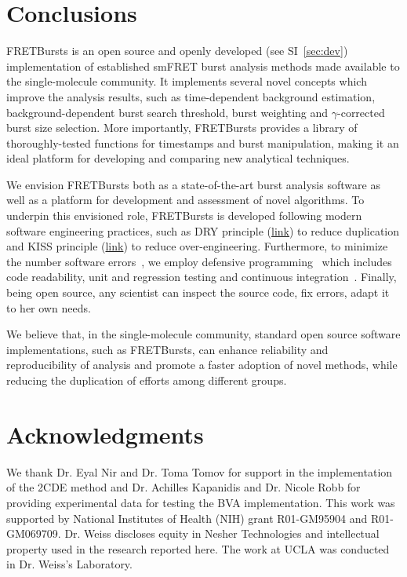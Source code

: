 \section{Conclusions}
\label{sec:conclusions}

FRETBursts is an open source and openly developed (see SI~\ref{sec:dev}) implementation
of established smFRET burst analysis methods
made available to the single-molecule community.
It implements several novel concepts which improve the analysis results, such as
time-dependent background estimation, background-dependent burst search threshold,
burst weighting and $\gamma$-corrected burst size selection.
More importantly, FRETBursts provides a library of thoroughly-tested functions
for timestamps and burst manipulation, making it an ideal platform for
developing and comparing new analytical techniques.

We envision FRETBursts both as a state-of-the-art burst analysis
software as well as a platform for development and assessment of novel algorithms.
To underpin this envisioned role, FRETBursts is developed following modern
software engineering practices, such as DRY principle
(\href{http://en.wikipedia.org/wiki/Don\%27t_repeat_yourself}{link})
to reduce duplication and KISS principle
(\href{http://en.wikipedia.org/wiki/KISS_principle}{link})
to reduce over-engineering. Furthermore, to minimize the number software errors~\cite{Merali_2010,Soergel_2015},
we employ defensive programming~\cite{Prli__2012} which includes code readability,
unit and regression testing and continuous integration~\cite{Eglen_2016}.
Finally, being open source, any scientist can inspect the source code,
fix errors, adapt it to her own needs.

We believe that, in the single-molecule community,
standard open source software implementations, such as FRETBursts, can enhance
reliability and reproducibility of analysis and promote a faster adoption of novel methods,
while reducing the duplication of efforts among different groups.

\section*{Acknowledgments}
We thank Dr. Eyal Nir and Dr. Toma Tomov for support in the implementation of the 2CDE method and Dr. Achilles Kapanidis and Dr. Nicole Robb for providing 
experimental data for testing the BVA implementation.
This work was supported by National Institutes of Health (NIH)
grant R01-GM95904 and R01-GM069709. Dr. Weiss discloses equity in
Nesher Technologies and intellectual property used in the research
reported here. The work at UCLA was conducted in Dr. Weiss’s Laboratory. 
